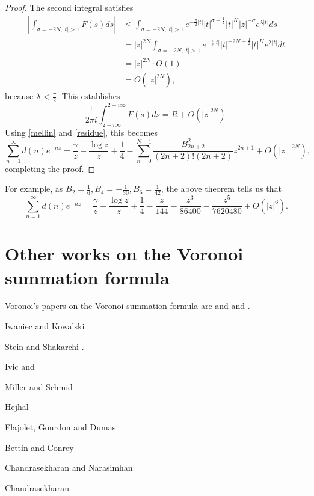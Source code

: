 \documentclass{article}
\begin{document}
\begin{proof}
The second integral satisfies
\begin{align*}
\left| \int_{\sigma=-2N, |t|>1} F(s) ds \right| &
\leq
 \int_{\sigma=-2N, |t|>1}
e^{-\frac{\pi}{2} |t|} |t|^{\sigma-\frac{1}{2}} |t|^K |z|^{-\sigma} e^{\lambda |t|}  ds\\
&=|z|^{2N}  \int_{\sigma=-2N, |t|>1} e^{-\frac{\pi}{2} |t|} |t|^{-2N-\frac{1}{2}} |t|^K  e^{\lambda |t|}  dt\\
&=|z|^{2N} \cdot O(1)\\
&=O(|z|^{2N}),
\end{align*}
because $\lambda<\frac{\pi}{2}$. This establishes
\[
\frac{1}{2\pi i} \int_{2-i\infty}^{2+i\infty} F(s) ds = R +O(|z|^{2N}).
\]
Using \eqref{mellin} and \eqref{residue}, this becomes
\[
\sum_{n=1}^\infty d(n) e^{-nz} = 
\frac{\gamma}{z}-\frac{\log z}{z}+\frac{1}{4} - \sum_{n=0}^{N-1}  \frac{B_{2n+2}^2}{(2n+2)!(2n+2)} z^{2n+1}
+O(|z|^{-2N}),
\]
completing the proof.
\end{proof}

For example,
as $B_2=\frac{1}{6},B_4=-\frac{1}{30},B_6=\frac{1}{42}$, the above theorem tells us that
\[
\sum_{n=1}^\infty d(n)e^{-nz} =  \frac{\gamma}{z}-\frac{\log z}{z}+\frac{1}{4}
-\frac{z}{144}
-\frac{z^3}{86400}
-\frac{z^5}{7620480}+
O(|z|^6).
\]


\section{Other works on the Voronoi summation formula}
Voronoi's papers on the Voronoi summation formula are \cite{voronoi1903} and \cite{voronoiI} and \cite{voronoiII}. 

Iwaniec and Kowalski \cite[Chaper 4]{iwaniec}

Stein and Shakarchi \cite[p.~392, Theorem 8.11]{stein}.

Ivic \cite[pp.~83ff., Chapter 3]{ivic} and \cite{laplace}

Miller and Schmid \cite{miller}

Hejhal \cite{hejhal}

Flajolet, Gourdon and Dumas \cite{flajolet}

Bettin and Conrey \cite{bettin}

Chandrasekharan  and Narasimhan \cite{hecke}

Chandrasekharan \cite[Chapter VIII]{chandra}




\end{document}
